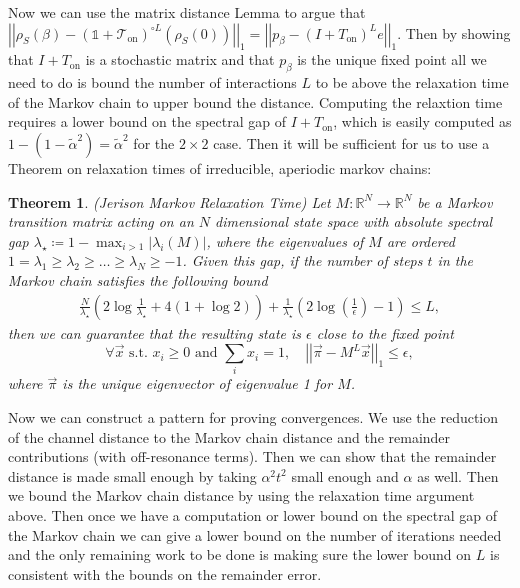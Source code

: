 \documentclass{article}
\newtheorem{theorem}{Theorem}
\newcommand{\on}{\text{on}}
\newcommand{\norm}[1]{\left| \left| #1 \right| \right|}
\newcommand{\identity}{\mathds{1}}
\begin{document}
Now we can use the matrix distance Lemma to argue that $\norm{\rho_S(\beta) - (\identity + \mathcal{T}_{\on})^{\circ L}(\rho_S(0))}_1 = \norm{p_{\beta} - (I + T_{\on})^L e}_1$. Then by showing that $I + T_{\on}$ is a stochastic matrix and that $p_{\beta}$ is the unique fixed point all we need to do is bound the number of interactions $L$ to be above the relaxation time of the Markov chain to upper bound the distance. Computing the relaxtion time requires a lower bound on the spectral gap of $I + T_{\on}$, which is easily computed as $1 - (1 - \widetilde{\alpha}^2) = \widetilde{\alpha}^2$ for the $2 \times 2$ case. Then it will be sufficient for us to use a Theorem on relaxation times of irreducible, aperiodic markov chains:
\begin{theorem}(Jerison Markov Relaxation Time) \label{thm:markov_chain_bound}
    Let $M : \mathbb{R}^{N} \to  \mathbb{R}^{N}$ be a Markov transition matrix acting on an $N$ dimensional state space with absolute spectral gap $\lambda_{\star} \coloneqq 1 - \max_{i > 1} |\lambda_i(M)|$, where the eigenvalues of $M$ are ordered $1 = \lambda_1 \ge \lambda_2 \ge \ldots \ge \lambda_N \geq -1$. Given this gap, if the number of steps $t$ in the Markov chain satisfies the following bound
    \begin{align}
        \frac{N}{\lambda_{\star}} \left( 2\log \frac{1}{\lambda_{\star}} + 4(1 + \log 2)\right) + \frac{1}{\lambda_{\star}} \left(2 \log \left( \frac{1}{\epsilon} \right) - 1\right) \le L,
    \end{align}
    then we can guarantee that the resulting state is $\epsilon$ close to the fixed point
    \begin{equation}
        \forall \vec{x} \text{ s.t. } x_i \ge 0 \text{ and } \sum_i x_i = 1, \quad \norm{\vec{\pi} - M^L \vec{x}}_1 \le \epsilon,
    \end{equation}
    where $\vec{\pi}$ is the unique eigenvector of eigenvalue 1 for $M$.
\end{theorem}

Now we can construct a pattern for proving convergences. We use the reduction of the channel distance to the Markov chain distance and the remainder contributions (with off-resonance terms). Then we can show that the remainder distance is made small enough by taking $\alpha^2 t^2$ small enough and $\alpha$ as well. Then we bound the Markov chain distance by using the relaxation time argument above. Then once we have a computation or lower bound on the spectral gap of the Markov chain we can give a lower bound on the number of iterations needed and the only remaining work to be done is making sure the lower bound on $L$ is consistent with the bounds on the remainder error.
\end{document}

